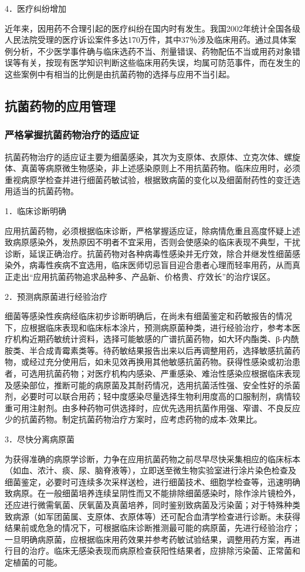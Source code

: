 4．医疗纠纷增加

近年来，因用药不合理引起的医疗纠纷在国内时有发生。我国2002年统计全国各级人民法院受理的医疗诉讼案件多达170万件，其中37％涉及临床用药。通过具体案例分析，不少医学事件确与临床选药不当、剂量错误、药物配伍不当或用药对象错误等有关，按现有医学知识判断这些临床用药失误，均属可防范事件，而在发生的这些案例中有相当的比例是由抗菌药物的选择与应用不当引起。

\subsection{抗菌药物的应用管理}

\subsubsection{严格掌握抗菌药物治疗的适应证}

抗菌药物治疗的适应证主要为细菌感染，其次为支原体、衣原体、立克次体、螺旋体、真菌等病原微生物感染，非上述感染原则上不用抗菌药物。临床应用时，必须重视病原学检查并进行细菌药敏试验，根据致病菌的变化以及细菌耐药性的变迁选用适当的抗菌药物。

1．临床诊断明确

应用抗菌药物，必须根据临床诊断，严格掌握适应证，除病情危重且高度怀疑上述致病原感染外，发热原因不明者不宜采用，否则会使感染的临床表现不典型，干扰诊断，延误正确治疗。抗菌药物对各种病毒性感染并无疗效，除合并继发性细菌感染外，病毒性疾病不宜选用，临床医师切忌盲目迎合患者心理而轻率用药，从而真正走出“应用抗菌药物追求品种多、产品新、价格贵、疗效长”的治疗误区。

2．预测病原菌进行经验治疗

细菌等感染性疾病经临床初步诊断明确后，在尚未有细菌鉴定和药敏报告的情况下，应根据临床表现和临床标本涂片，预测病原菌种类，进行经验治疗，参考本医疗机构近期药敏统计资料，选择可能敏感的广谱抗菌药物，如大环内酯类、β-内酰胺类、半合成青霉素类等。待药敏结果报告出来以后再调整用药，选择敏感抗菌药物，或经过充分使用后，如未见效再换用其他敏感抗菌药物。获得性感染或初治患者，可选用抗菌药物；对医疗机构内感染、严重感染、难治性感染应根据临床表现及感染部位，推断可能的病原菌及其耐药情况，选用抗菌活性强、安全性好的杀菌剂，必要时可以联合用药；轻中度感染尽量选择生物利用度高的口服制剂，病情较重可用注射剂。由多种药物可供选择时，应优先选用抗菌作用强、窄谱、不良反应少的抗菌药物。制定抗菌药物治疗方案时，应考虑药物的成本-效果比。

3．尽快分离病原菌

为获得准确的病原学诊断，力争在应用抗菌药物之前尽早尽快采集相应的临床标本（如血、浓汁、痰、尿、脑脊液等），立即送至微生物实验室进行涂片染色检查及细菌鉴定，必要时可连续多次采样送检，进行细菌技术、细胞学检查等，迅速明确致病原。在一般细菌培养连续呈阴性而又不能排除细菌感染时，除作涂片镜检外，还应进行微需氧菌、厌氧菌及真菌培养，同时鉴别致病菌及污染菌；对于特殊种类致病源（如军团菌属、支原体、衣原体等）还可配合血清学检查进行诊断。未获得结果前或危急的情况下，可根据临床诊断推测最可能的病原菌，先进行经验治疗；一旦明确病原菌，应根据临床用药效果并参考药敏试验结果，调整用药方案，再进行目的治疗。临床无感染表现而病原检查获阳性结果者，应排除污染菌、正常菌和定植菌的可能。

